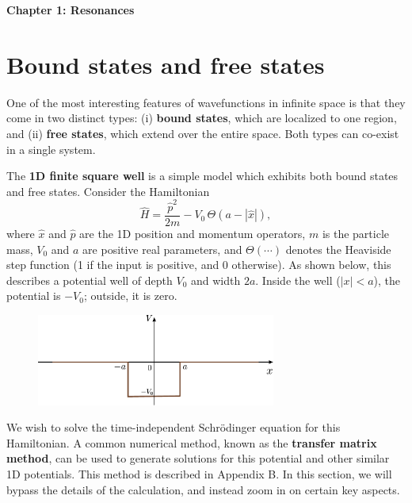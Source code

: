\documentclass[pra,12pt]{revtex4}
\begin{document}
\begin{center}
{\Large \textbf{Chapter 1: Resonances}}
\end{center}

\section{Bound states and free states}

One of the most interesting features of wavefunctions in infinite
space is that they come in two distinct types: (i) \textbf{bound
  states}, which are localized to one region, and (ii) \textbf{free
  states}, which extend over the entire space.  Both types can
co-exist in a single system.

The \textbf{1D finite square well} is a simple model which exhibits
both bound states and free states.  Consider the Hamiltonian
$$\hat{H} = \frac{\hat{p}^2}{2m} - V_0 \,\Theta(a -|\hat{x}|),$$ where
$\hat{x}$ and $\hat{p}$ are the 1D position and momentum operators,
$m$ is the particle mass, $V_0$ and $a$ are positive real parameters,
and $\Theta(\cdots)$ denotes the Heaviside step function (1 if the
input is positive, and 0 otherwise).  As shown below, this describes a
potential well of depth $V_0$ and width $2a$.  Inside the well ($|x| <
a$), the potential is $-V_0$; outside, it is zero.

\begin{figure}[h]
  \centering\includegraphics[width=0.7\textwidth]{squarewell}
\end{figure}

We wish to solve the time-independent Schr\"odinger equation for this
Hamiltonian.  A common numerical method, known as the \textbf{transfer
  matrix method}, can be used to generate solutions for this potential
and other similar 1D potentials.  This method is described in Appendix
B.  In this section, we will bypass the details of the calculation,
and instead zoom in on certain key aspects.
\end{document}

